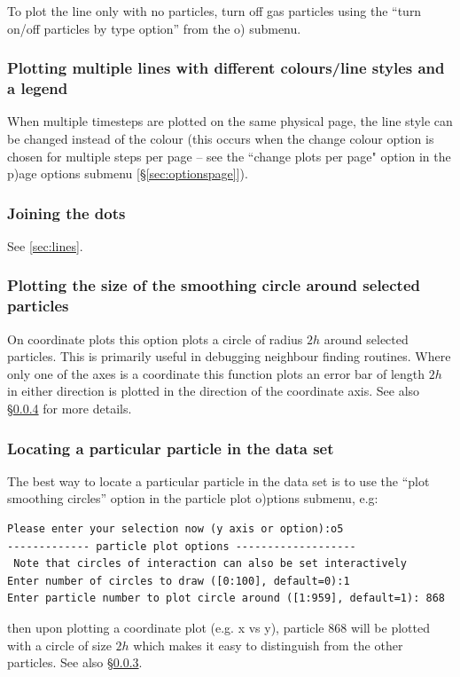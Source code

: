 \documentclass[a4paper,11pt]{article}
\begin{document}
 To plot the line only with no particles, turn off gas particles using the ``turn on/off particles by type option'' from the o) submenu.
 
\subsubsection{ Plotting multiple lines with different colours/line styles and a legend}

 When multiple timesteps are plotted on the same physical page, the line style can be
changed instead of the colour (this occurs when the change colour option is chosen for multiple steps per page
-- see the ``change plots per page" option in the p)age options submenu [\S\ref{sec:optionspage}]).

\subsubsection{ Joining the dots}
See \ref{sec:lines}.

\subsubsection{ Plotting the size of the smoothing circle around selected particles}
\label{sec:smoothingcircle}
On coordinate plots this option plots a circle of
radius $2h$ around selected particles. 
This is primarily useful in debugging neighbour finding routines. Where only one of the axes is a 
coordinate this function plots an error bar of length $2h$ in either direction is plotted
in the direction of the coordinate axis. See also \S\ref{sec:findingaparticle} for more details.

\subsubsection{ Locating a particular particle in the data set}
\label{sec:findingaparticle}
 The best way to locate a particular particle in the data set is to use the ``plot smoothing circles'' option in the particle plot o)ptions submenu, e.g:
\begin{verbatim}
Please enter your selection now (y axis or option):o5
------------- particle plot options -------------------
 Note that circles of interaction can also be set interactively
Enter number of circles to draw ([0:100], default=0):1
Enter particle number to plot circle around ([1:959], default=1): 868
\end{verbatim}
 then upon plotting a coordinate plot (e.g. x vs y), particle 868 will be plotted with a circle of size $2h$ which makes it easy to distinguish from the other particles. See also \S\ref{sec:smoothingcircle}.
\end{document}
